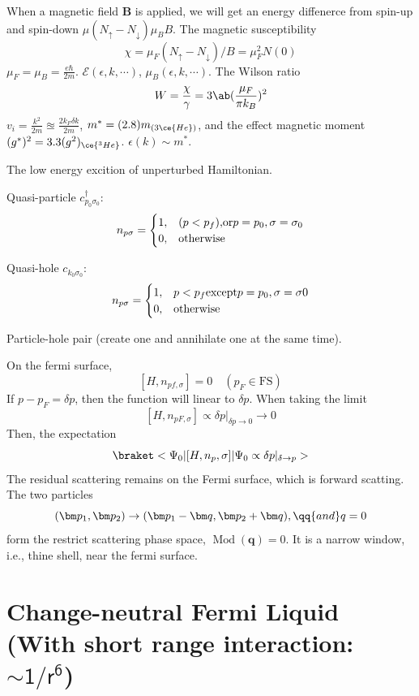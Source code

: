 \begin{enumext}
  When a magnetic field $\bm B$ is applied, we will get an energy diffenerce from spin-up and spin-down $\mu(N_\uparrow - N_\downarrow)\mu_BB$.
  The magnetic susceptibility
  \begin{equation}
    \chi = \mu_F(N_\uparrow - N_\downarrow)/B = \mu_F^2 N(0)
  \end{equation}
  $\mu_F = \mu_B = \frac{e\hbar}{2m}$. $\mathcal E(\epsilon, k, \cdots)$,
  $\mu_B(\epsilon, k, \cdots)$.
  The Wilson ratio
  \begin{equation}
    W = \frac\chi\gamma = 3\ab(\frac{\mu_F}{\pi k_B})^2
  \end{equation}
  $v_i = \frac{k^2}{2m} \approxeq \frac{2k_F\delta k}{2m}$, $m^* = (2.8) m_{(3\ce{He})}$, and the effect magnetic moment $(g^*)^2 = 3.3 (g^2)_{\ce{^3He}}$.
  $\epsilon(k) \sim m^*$.
\end{enumext}

The low energy excition of unperturbed Hamiltonian.
\begin{enumext}
  \item Quasi-particle $c_{p_0\sigma_0}^\dagger$:
  \[
    n_{p\sigma} = \begin{cases}
      1, & (p<p_f), $or$ p = p_0, \sigma = \sigma_0\\
      0, & $otherwise$
    \end{cases}
  \]
  \item Quasi-hole $c_{k_0\sigma_0}$:
  \[
    n_{p\sigma} = \begin{cases}
      1, & p<p_f $except$ p = p_0, \sigma = \sigma 0\\
      0, & $otherwise$
    \end{cases}
  \]
  \item Particle-hole pair (create one and annihilate one at the same time).
\end{enumext}
On the fermi surface,
\[
  [H, n_{pf,\sigma}] = 0 \quad (p_F \in \text{FS})
\]
If $p - p_F = \delta p$, then the function will linear to $\delta p$.
When taking the limit
\[
  [H, n_{pF,\sigma}] \propto \delta p \big|_{\delta p\to 0} \to 0
\]
Then, the expectation
\[
  \braket<\Psi_0|[H, n_p, \sigma]|\Psi_0 \propto \delta p|_{\delta\to p}>
\]
The residual scattering remains on the Fermi surface, which is forward scatting.
The two particles
\[
  (\bm p_1, \bm p_2) \to (\bm p_1 - \bm q, \bm p_2 + \bm q), \qq{and} q = 0
\]
form the restrict scattering phase space, $\operatorname{Mod}(\bm q) = 0$.
It is a narrow window, i.e., thine shell, near the fermi surface.

\section{Change-neutral Fermi Liquid (With short range interaction:
  $\mathsf{\sim 1/r^6}$)}

